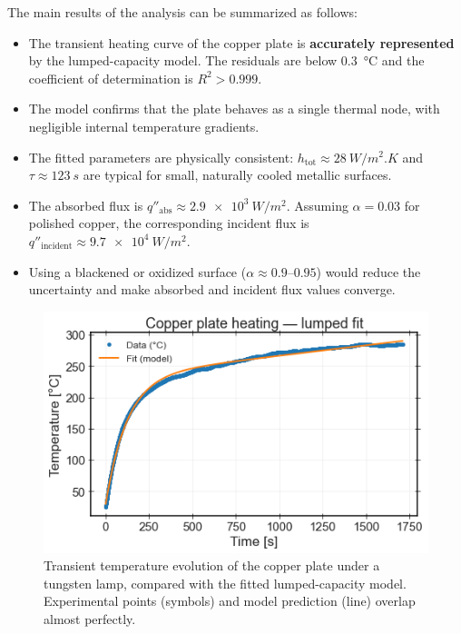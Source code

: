\documentclass[a4paper,11pt]{article}
\begin{document}
The main results of the analysis can be summarized as follows:
\begin{itemize}
  \item The transient heating curve of the copper plate is \textbf{accurately represented} by the lumped-capacity model.  
        The residuals are below \SI{0.3}{\degreeCelsius} and the coefficient of determination is $R^2>0.999$.
  \item The model confirms that the plate behaves as a single thermal node, with negligible internal temperature gradients.
  \item The fitted parameters are physically consistent:  
        $h_{\text{tot}}\approx\SI{28}{W/m^2.K}$ and $\tau\approx\SI{123}{s}$ are typical for small, naturally cooled metallic surfaces.
  \item The absorbed flux is $q''_{\text{abs}}\approx\SI{2.9e3}{W/m^2}$.  
        Assuming $\alpha=0.03$ for polished copper, the corresponding incident flux is $q''_{\text{incident}}\approx\SI{9.7e4}{W/m^2}$.
  \item Using a blackened or oxidized surface ($\alpha\approx0.9$--$0.95$) would reduce the uncertainty and make absorbed and incident flux values converge.
\end{itemize}
\begin{figure}[h!]
\centering
\includegraphics[width=0.85\linewidth]{Curbe copper heating.png}
\caption{Transient temperature evolution of the copper plate under a tungsten lamp, compared with the fitted lumped-capacity model. Experimental points (symbols) and model prediction (line) overlap almost perfectly.}
\label{fig:coppercurve}
\end{figure}
\end{document}
